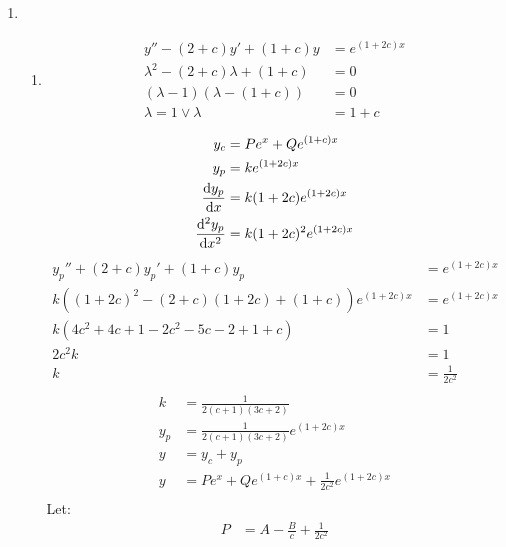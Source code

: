 \documentclass[10pt,\jkfside,a4paper]{article}
\begin{document}
\begin{enumerate}
\begin{enumerate}
\end{enumerate}

\item
\begin{enumerate}
\item
\begin{equation}
\begin{split}
y'' - (2 + c)y' + (1 + c)y &= e^{(1 + 2c)x}\\
\lambda^2 - (2 + c)\lambda + (1 + c) &= 0\\
(\lambda - 1)(\lambda - (1 + c)) &= 0\\
\lambda = 1 \vee \lambda &= 1 + c\\
\end{split}
\end{equation}
\begin{equation}
\begin{split}
y_c &= Pe^x + Qe^{(1 + c)x}\\
y_p &= ke^{(1 + 2c)x}\\
\dv{y_p}{x} &= k(1 + 2c)e^{(1 + 2c)x}\\
\dv[2]{y_p}{x} &= k(1 + 2c)^2e^{(1 + 2c)x}\\
\end{split}
\end{equation}
\begin{equation}
\begin{split}
y_p'' + (2 + c)y_p' + (1 + c)y_p &= e^{(1 + 2c)x}\\
k((1 + 2c)^2 - (2 + c)(1 + 2c) + (1 + c))e^{(1 + 2c)x} &= e^{(1 + 2c)x}\\
k(4c^2 + 4c + 1 - 2c^2 - 5c - 2 + 1 + c) &= 1\\
2c^2k &= 1\\
k &= \frac{1}{2c^2}\\
\end{split}
\end{equation}
\begin{equation}
\begin{split}
k &= \frac{1}{2(c + 1)(3c + 2)}\\
y_p &= \frac{1}{2(c + 1)(3c + 2)}e^{(1 + 2c)x}\\
y &= y_c + y_p\\
y &= Pe^x + Qe^{(1 + c)x} + \frac{1}{2c^2}e^{(1 + 2c)x}\\
\end{split}
\end{equation}
Let:
\begin{equation}
\begin{split}
P &= A - \frac{B}{c} + \frac{1}{2c^2}\\

\end{split}
\end{equation}
\end{enumerate}
\end{enumerate}
\end{document}
